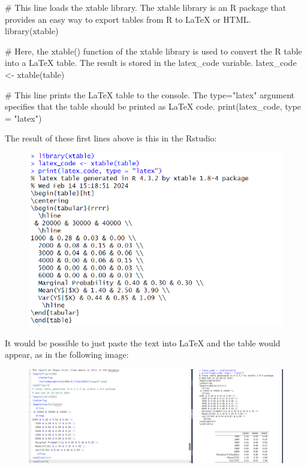\documentclass{article}
\begin{document}
\begin{spverbatim}

# This line loads the xtable library. The xtable library is an R package that provides an easy way to export tables from R to LaTeX or HTML.
library(xtable)

# Here, the xtable() function of the xtable library is used to convert the R table into a LaTeX table. The result is stored in the latex_code variable.
latex_code <- xtable(table)

# This line prints the LaTeX table to the console. The type="latex" argument specifies that the table should be printed as LaTeX code.
print(latex_code, type = "latex")
\end{spverbatim}
The result of these first lines above is this in the Rstudio:
\begin{figure}[H]
    \centering
    \includegraphics[width=1\linewidth]{imagesfolder/image25.png}
\end{figure}
It would be possible to just paste the text into LaTeX and the table would appear, as in the following image:
\begin{figure}[H]
    \centering
    \includegraphics[width=1\linewidth]{imagesfolder/image26.png}
\end{figure}
\end{document}
